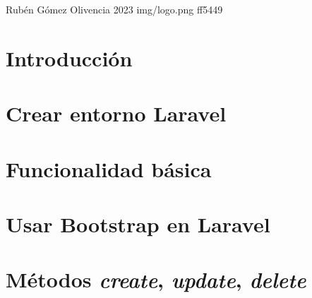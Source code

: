 \documentclass{\ClassPath/yukibook}
\begin{document}
    {Rubén Gómez Olivencia}  %
    {2023}    %
    {} %
    {} %
    {} %
    {img/logo.png} %
    {ff5449}
    {} %

    \coverpage
    \graphicspath{{../../yukibook.cls/}}
    \licensepage
    \tableofcontents

    \graphicspath{{img/}}

    \part{Introducción}
    
    

    \part{Crear entorno Laravel}
    
    

    \part{Funcionalidad básica}
    

    \part{Usar Bootstrap en Laravel}
    

    \part{Métodos \textit{create}, \textit{update}, \textit{delete}}
    

\end{document}
